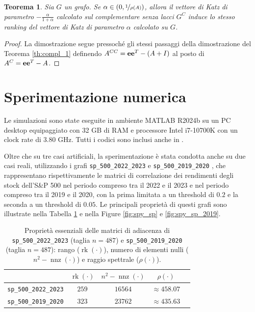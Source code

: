 \documentclass[a4paper]{article}
\newcommand{\evec}{{\bf e}}
\DeclareMathOperator{\nnz}{nnz}
\DeclareMathOperator{\rk}{rk}
\newtheorem{theorem}{Teorema}
\begin{document}
\begin{theorem}
    \label{th:compl_2}
    Sia $G$ un grafo. Se $\alpha \in (0, \nicefrac{1}{\rho(A)})$, allora il vettore di Katz di parametro $-\frac{\alpha}{1+\alpha}$ calcolato sul complementare senza lacci $G^C$
    induce lo stesso ranking del vettore di Katz di parametro $\alpha$ calcolato su $G$.
\end{theorem}

\begin{proof}
    La dimostrazione segue pressoché gli stessi passaggi della dimostrazione del Teorema \ref{th:compl_1} definendo
    $A^{CC} = \evec \evec^T - (A+I)$ al posto di $A^C = \evec \evec^T - A$.
\end{proof}

\section{Sperimentazione numerica}

Le simulazioni sono state eseguite in ambiente MATLAB R2024b su un PC desktop equipaggiato con 32 GB di RAM e
processore Intel i7-10700K con un clock rate di 3.80 GHz. Tutti i codici sono inclusi anche in \cite{hearotCode}. \medskip

Oltre che su tre casi artificiali, la sperimentazione è stata condotta anche su due casi reali,
utilizzando i grafi \texttt{sp\_500\_2022\_2023} e \texttt{sp\_500\_2019\_2020} \cite{hearotCode},
che rappresentano rispettivamente le matrici di correlazione dei rendimenti degli stock dell'S\&P 500 nel periodo
compreso tra il 2022 e il 2023 e nel periodo compreso tra il 2019 e il 2020, con la prima limitata a un threshold
di $0.2$ e la seconda a un threshold di $0.05$. Le principali proprietà di
questi grafi sono illustrate nella Tabella \ref{tab:prop_sp} e nella Figure \ref{fig:spy_sp} e \ref{fig:spy_sp_2019}.

\begin{table}[H]
    \centering
    \label{tab:prop_sp}
        
    \begin{tabular}{|l|c|c|c|c|}       
        \hline
                                     & $\rk(\cdot)$  & $n^2 - \nnz(\cdot)$  & $\rho(\cdot)$ \\
        \hline
        \texttt{sp\_500\_2022\_2023} & $259$ & $16564$ & $\approx 458.07$                  \\
        \hline
        \texttt{sp\_500\_2019\_2020} & $323$ & $23762$ & $\approx 435.63$                  \\
        \hline
    \end{tabular}

    \caption{Proprietà essenziali delle matrici di adiacenza di \texttt{sp\_500\_2022\_2023} (taglia $n = 487$) e \texttt{sp\_500\_2019\_2020} (taglia $n = 487$): rango ($\rk(\cdot)$), numero di elementi nulli ($n^2 - \nnz(\cdot)$) e raggio spettrale ($\rho(\cdot)$).}
\end{table}
\end{document}
